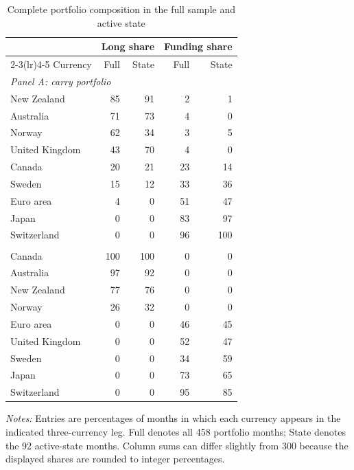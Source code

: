 \begin{table}[H]
\centering
\caption{Complete portfolio composition in the full sample and active state}
\label{tab:v03-portfolio-composition-full}
\footnotesize
\begin{tabular}{lrrrr}
\toprule
& \multicolumn{2}{c}{Long share} & \multicolumn{2}{c}{Funding share} \\
\cmidrule(lr){2-3}\cmidrule(lr){4-5}
Currency & Full & State & Full & State \\
\midrule
\multicolumn{5}{l}{\emph{Panel A: carry portfolio}} \\
New Zealand & 85 & 91 & 2 & 1 \\
Australia & 71 & 73 & 4 & 0 \\
Norway & 62 & 34 & 3 & 5 \\
United Kingdom & 43 & 70 & 4 & 0 \\
Canada & 20 & 21 & 23 & 14 \\
Sweden & 15 & 12 & 33 & 36 \\
Euro area & 4 & 0 & 51 & 47 \\
Japan & 0 & 0 & 83 & 97 \\
Switzerland & 0 & 0 & 96 & 100 \\
\addlinespace
\multicolumn{5}{l}{\emph{Panel B: equity-beta portfolio}} \\
Canada & 100 & 100 & 0 & 0 \\
Australia & 97 & 92 & 0 & 0 \\
New Zealand & 77 & 76 & 0 & 0 \\
Norway & 26 & 32 & 0 & 0 \\
Euro area & 0 & 0 & 46 & 45 \\
United Kingdom & 0 & 0 & 52 & 47 \\
Sweden & 0 & 0 & 34 & 59 \\
Japan & 0 & 0 & 73 & 65 \\
Switzerland & 0 & 0 & 95 & 85 \\
\bottomrule
\end{tabular}

\begin{minipage}{0.82\textwidth}
\footnotesize\emph{Notes:} Entries are percentages of months in which each currency appears in the indicated three-currency leg. Full denotes all 458 portfolio months; State denotes the 92 active-state months. Column sums can differ slightly from 300 because the displayed shares are rounded to integer percentages.
\end{minipage}
\end{table}
